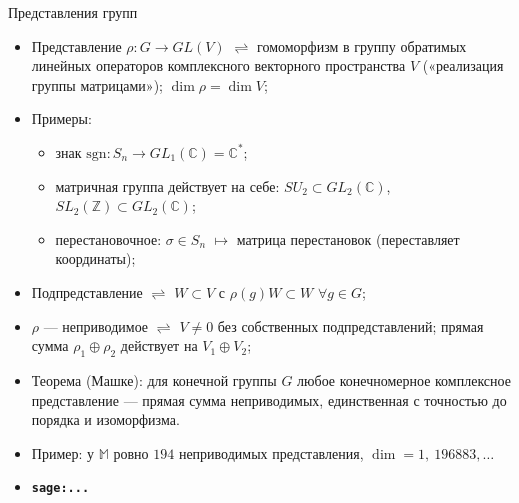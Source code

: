 \documentclass[serif, aspectratio=169]{beamer}
\newcommand{\sagemark}{%
  \textcolor{green!40!black}{\textbf{\texttt{sage:...}}}%
}
\begin{document}
\begin{frame}{Представления групп}
    \begin{itemize}
        \item Представление $\rho\colon G\to GL(V)$ $\rightleftharpoons$ гомоморфизм в группу обратимых линейных операторов комплексного векторного пространства $V$ («реализация группы матрицами»); $\dim\rho=\dim V$;
        \item Примеры:
        \begin{itemize}
            \item знак $\mathrm{sgn}\colon S_n\to GL_1(\mathbb{C})=\mathbb{C}^*$; 
            \item матричная группа действует на себе: $SU_2\subset GL_2(\mathbb{C})$, $SL_2(\mathbb{Z})\subset GL_2(\mathbb{C})$;
            \item перестановочное: $\sigma\in S_n$ $\mapsto$ матрица перестановок (переставляет координаты);
        \end{itemize}
        \item Подпредставление $\rightleftharpoons$ $W\subset V$ с $\rho(g)W\subset W$ $\forall g\in G$; 
        \item $\rho$ --- неприводимое $\rightleftharpoons$ $V\neq0$ без собственных подпредставлений; прямая сумма $\rho_1\oplus\rho_2$ действует на $V_1\oplus V_2$;
        \item Теорема (Машке): для конечной группы $G$ любое конечномерное комплексное представление --- прямая сумма неприводимых, единственная с точностью до порядка и изоморфизма.
        \item Пример: у $\mathbb M$ ровно $194$ неприводимых представления, $\dim=1,\ 196883,\dots$
        \item \sagemark
    \end{itemize}
\end{frame}
\end{document}
